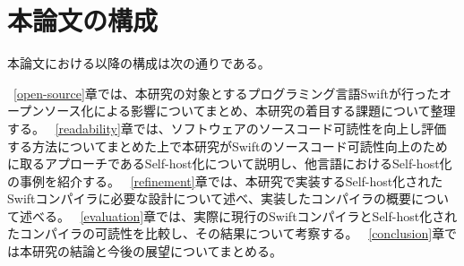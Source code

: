 \section{本論文の構成}

本論文における以降の構成は次の通りである。

~\ref{open-source}章では、本研究の対象とするプログラミング言語Swiftが行ったオープンソース化による影響についてまとめ、本研究の着目する課題について整理する。
~\ref{readability}章では、ソフトウェアのソースコード可読性を向上し評価する方法についてまとめた上で本研究がSwiftのソースコード可読性向上のために取るアプローチであるSelf-host化について説明し、他言語におけるSelf-host化の事例を紹介する。
~\ref{refinement}章では、本研究で実装するSelf-host化されたSwiftコンパイラに必要な設計について述べ、実装したコンパイラの概要について述べる。
~\ref{evaluation}章では、実際に現行のSwiftコンパイラとSelf-host化されたコンパイラの可読性を比較し、その結果について考察する。
~\ref{conclusion}章では本研究の結論と今後の展望についてまとめる。

